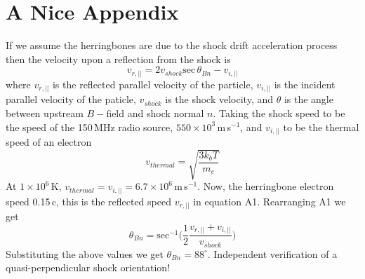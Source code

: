 
\chapter{A Nice Appendix}
\label{app:1}

If we assume the herringbones are due to the shock drift acceleration process then the velocity upon a reflection from the shock is
\begin{equation}
v_{r,||} = 2v_{shock}\mathrm{sec}\,\theta_{Bn} - v_{i,||}
\end{equation}
where $v_{r,||}$ is the reflected parallel velocity of the particle, $v_{i,||}$ is the incident parallel velocity of the paticle, $v_{shock}$ is the shock velocity, and $\theta$ is the angle between upstream $B-$field and shock normal $n$. Taking the shock speed to be the speed of the 150\,MHz radio source, $550\times10^3$\,m\,s$^{-1}$, and $v_{i,||}$ to be the thermal speed of an electron 
\begin{equation} 
v_{thermal} = \sqrt{ \frac{3k_bT}{m_e} }
\end{equation}
At $1\times10^{6}$\,K, $v_{thermal} = v_{i,||} = 6.7\times10^6$\,m\,s$^{-1}$. Now, the herringbone electron speed 0.15\,c, this is the reflected speed $v_{r,||}$ in equation A1. Rearranging A1 we get
\begin{equation}
\theta_{Bn} = \mathrm{sec}^{-1}\bigg( \frac{1}{2}\frac{v_{r,||} +  v_{i,||} }{v_{shock}}\bigg)
\end{equation}
Substituting the above values we get $\theta_{Bn}=88^{\circ}$. Independent verification of a quasi-perpendicular shock orientation!


